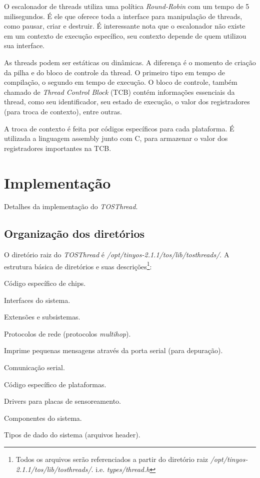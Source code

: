 \documentclass[a4paper,onecolumn, 10pt]{article}
\begin{document}
O escalonador de threads utiliza uma política \textit{Round-Robin} com um tempo de 5 milisegundos. É ele que oferece
toda a interface para manipulação de threads, como pausar, criar e destruir. É interessante nota que o escalonador não
existe em um contexto de execução específico, seu contexto depende de quem utilizou sua interface.

As threads podem ser estáticas ou dinâmicas. A diferença é o momento de criação da pilha e do bloco de controle da
thread. O primeiro tipo em tempo de compilação, o segundo em tempo de execução. O bloco de controle, também chamado de
\textit{Thread Control Block} (TCB) contém informações essenciais da thread, como seu identificador, seu estado de
execução, o valor dos registradores (para troca de contexto), entre outras.

A troca de contexto é feita por códigos específicos para cada plataforma. É utilizada a linguagem assembly junto com C,
para armazenar o valor dos registradores importantes na TCB.


\section{Implementação}
Detalhes da implementação do \textit{TOSThread}.

\subsection{Organização dos diretórios}
O diretório raiz do \textit{TOSThread} é \textit{/opt/tinyos-2.1.1/tos/lib/tosthreads/}.
A estrutura básica de diretórios e suas descrições\footnote{Todos os arquivos serão referenciados a partir do diretório
raiz \textit{/opt/tinyos-2.1.1/tos/lib/tosthreads/}. i.e. \textit{types/thread.h}}:
\begin{description}
\setlength{\itemsep}{0.2pt}
\setlength{\parskip}{0pt}
\setlength{\parsep}{0pt}
    \item[chips:] Código específico de chips.
    \item[interfaces:] Interfaces do sistema.
    \item[lib:] Extensões e subsistemas.
        \begin{description}
        \setlength{\itemsep}{0.2pt}
        \setlength{\parskip}{0pt}
        \setlength{\parsep}{0pt}
            \item[net:] Protocolos de rede (protocolos \textit{multihop}).
            \item[printf:] Imprime pequenas mensagens através da porta serial (para depuração).
            \item[serial:] Comunicação serial.
        \end{description}
    \item[platforms:] Código específico de plataformas.
    \item[sensorboards:] Drivers para placas de sensoreamento.
    \item[system:] Componentes do sistema.
    \item[types:] Tipos de dado do sistema (arquivos header).
\end{description}
\end{document}
